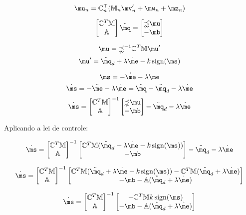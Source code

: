 $$ \mu_n = \mC_n^\top ( \mM_n \mv'_n + \mw_n + \mz_n ) $$

\newpage



$$
\begin{bmatrix}
\mC^T \mM \\
\mA
\end{bmatrix}
\ddot{\mq}
=
\begin{bmatrix}
\mathbb{\zeta} \mu \\
-\mb
\end{bmatrix}
$$



$$ \mu = \mathbb{\zeta}^{-1} \mC^T \mM \mu' $$
$$ \mu' = \ddot{\mq}_d + \lambda \dot{\me} - k  \sign (\ms) $$

$$ \ms = - \dot{\me} - \lambda \me $$
$$ \dot{\ms} = - \ddot{\me} - \lambda \dot{\me} = \ddot{\mq} - \ddot{\mq}_d  - \lambda \dot{\me} $$
$$ \dot{\ms} =  \begin{bmatrix}
\mC^T \mM \\
\mA
\end{bmatrix}^{-1}
\begin{bmatrix}
\mathbb{\zeta} \mu \\
-\mb
\end{bmatrix}
 - \ddot{\mq}_d  - \lambda \dot{\me} $$
 
Aplicando a lei de controle:

$$ \dot{\ms} =  \begin{bmatrix}
\mC^T \mM \\
\mA
\end{bmatrix}^{-1}
\begin{bmatrix}
 \mC^T \mM (\ddot{\mq}_d + \lambda \dot{\me} - k  \sign (\ms)) \\
-\mb
\end{bmatrix}
 - \ddot{\mq}_d  - \lambda \dot{\me} $$
 
 $$ \dot{\ms} =  \begin{bmatrix}
\mC^T \mM \\
\mA
\end{bmatrix}^{-1}
\begin{bmatrix}
 \mC^T \mM (\ddot{\mq}_d + \lambda \dot{\me} - k  \sign (\ms)) -  \mC^T \mM(\ddot{\mq}_d  + \lambda \dot{\me}) \\
-\mb - \mA(\ddot{\mq}_d  + \lambda \dot{\me})
\end{bmatrix} $$

 $$ \dot{\ms} =  \begin{bmatrix}
\mC^T \mM \\
\mA
\end{bmatrix}^{-1}
\begin{bmatrix}
- \mC^T \mM  k  \sign (\ms) \\
-\mb - \mA(\ddot{\mq}_d  + \lambda \dot{\me})
\end{bmatrix} $$

